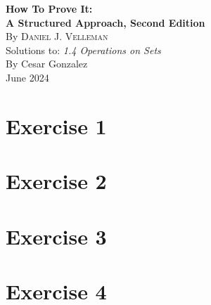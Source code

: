 \documentclass[letterpaper,10pt]{article}
\begin{document}
\pagestyle{fancy}
\setlength{\headheight}{15pt}
	\begin{flushleft}

\begin{center}

    {\Large\textbf{How To Prove It:}\\[0.2em] %
    \Large\textbf{A Structured Approach, Second Edition}}\\[1.5em]

    {\normalsize By \textsc{Daniel J. Velleman}}\\[1.5em]

    Solutions to: \textit{1.4 Operations on Sets}\\[1.5em]

    By Cesar Gonzalez\\[0.5em]
    June 2024
\end{center}

\tableofcontents
\newpage

\section*{Exercise 1}


\section*{Exercise 2}


\section*{Exercise 3}


\section*{Exercise 4}



\end{flushleft}
\end{document}
